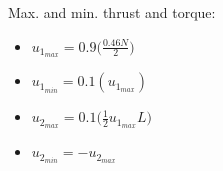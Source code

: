 \documentclass{thesisbeamer}
\begin{document}
\begin{frame}
\begin{columns}
\begin{column}{0.5\textwidth}
\begin{itemize}
            \end{itemize}
            Max. and min. thrust and torque:
            \begin{itemize}
                \item $u_{1_{max}} = 0.9 \bigg(\frac{0.46 N }{2}\bigg)$
                \item $u_{1_{min}} = 0.1(u_{1_{max}})$
                \item $u_{2_{max}} = 0.1 \bigg(\frac{1}{2} u_{1_{max}} L \bigg)$ 
                \item $u_{2_{min}} = - u_{2_{max}}$
            \end{itemize}
        \end{column}
    \end{columns}
\end{frame}
\end{document}
